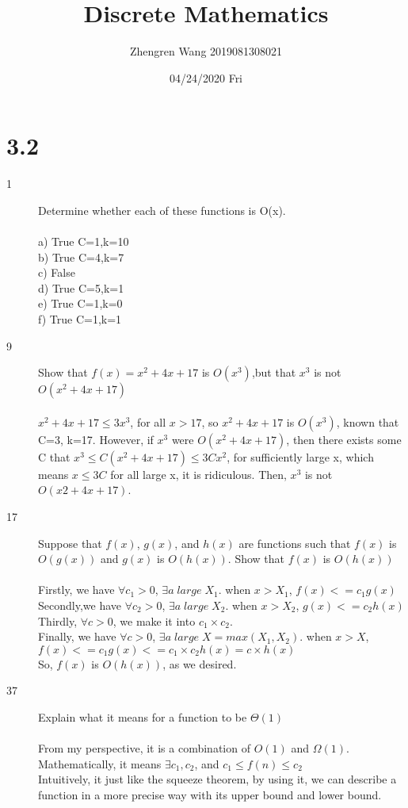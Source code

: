 \documentclass[UTF8]{article}
\title{Discrete Mathematics}
\author{Zhengren Wang 2019081308021}
\date{04/24/2020 Fri }
\begin{document}
\maketitle 

\part{3.2}
\begin{description}
    \item[1]Determine whether each of these functions is O(x). \\\\
        a) True   \quad C=1,k=10       \\
        b) True   \quad C=4,k=7      \\
        c) False        \\
        d) True   \quad C=5,k=1      \\
        e) True   \quad C=1,k=0      \\
        f) True   \quad C=1,k=1      \\
    \item[9]Show that $f(x)=x^2 + 4x + 17$ is $O(x^3)$,but that $x^3$ is not $O(x^2 + 4x + 17)$  \\\\
        $x^2+4x+17 \leq 3x^3$, for all $x>17$, so $x^2+4x+17$ is $O(x^3)$, known that C=3, k=17. However, if $x^3$ were $O(x^2+4x+17)$, then there exists some C that $x^3 \leq C(x^2+4x+17) \leq 3Cx^2$, for sufficiently large x, which means $x \leq 3C$ for all large x, it is ridiculous. Then, $x^3$ is not $O(x2 + 4x + 17)$.
        \item[17]Suppose that $f(x)$, $g(x)$, and $h(x)$ are functions such that $f(x)$ is $O(g(x))$ and $g(x)$ is $O(h(x))$. Show that $f(x)$ is $O(h(x))$ \\\\
        Firstly, we have $\forall c_1>0$, \; $\exists a \; large \; X_1$. when $x>X_1$,  $f(x)<=c_1g(x)$  \\
        Secondly,we have $\forall c_2>0$,\; $\exists a \; large \; X_2$. when $x>X_2$,  $g(x)<=c_2h(x)$  \\
        Thirdly, $\forall c>0$, we make it into $c_1 \times c_2$.  \\
        Finally, we have $\forall c>0$, $\exists a\; large \;X=max(X_1,X_2)$. when $x>X$,  $f(x)<=c_1g(x)<=c_1 \times c_2 h(x)=c\times h(x)$  \\
        So, $f(x)$ is $O(h(x))$, as we desired.
\item[37]Explain what it means for a function to be $\Theta(1)$ \\\\
    From my perspective, it is a combination of $O(1)$ and $\Omega(1)$. \\
    Mathematically, it means $\exists c_1, c_2$, and $c_1 \leq f(n) \leq c_2$     \\
    Intuitively, it just like the squeeze theorem, by using it, we can describe a function in a more precise way with its upper bound and lower bound.       

\end{description}
\end{document}
